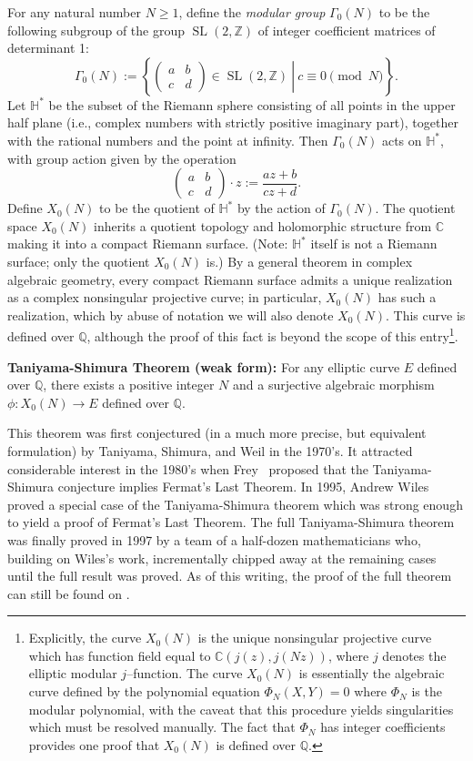 \documentclass[12pt]{article}
\newcommand{\SL}{\operatorname{SL}}
\newcommand{\Z}{{\mathbb{Z}}}
\renewcommand{\H}{{\mathbb{H}}}
\newcommand{\C}{{\mathbb{C}}}
\newcommand{\Q}{{\mathbb{Q}}}
\begin{document}
For any natural number $N \geq 1$, define the {\em modular group}
$\Gamma_0(N)$ to be the following subgroup of the group $\SL(2,\Z)$ of
integer coefficient matrices of determinant 1:
$$
\Gamma_0(N) := \left\{ \left. \begin{pmatrix} a & b \\ c & d
\end{pmatrix} \in \SL(2,\Z)\ \right|\ c \equiv 0 \pmod{N} \right\}.
$$
Let $\H^*$ be the subset of the Riemann sphere consisting of all
points in the upper half plane (i.e., complex numbers with strictly
positive imaginary part), together with the rational numbers and the
point at infinity. Then $\Gamma_0(N)$ acts on $\H^*$, with group
action given by the operation
$$
\begin{pmatrix} a & b \\ c & d \end{pmatrix} \cdot z := \frac{az+b}{cz+d}.
$$
Define $X_0(N)$ to be the quotient of $\H^*$ by the action of
$\Gamma_0(N)$. The quotient space $X_0(N)$ inherits a quotient
topology and holomorphic structure from $\C$ making it into a compact
Riemann surface. (Note: $\H^*$ itself is not a Riemann surface; only
the quotient $X_0(N)$ is.) By a general theorem in complex algebraic
geometry, every compact Riemann surface admits a unique realization as
a complex nonsingular projective curve; in particular, $X_0(N)$ has
such a realization, which by abuse of notation we will also denote
$X_0(N)$. This curve is defined over $\Q$, although the proof of this
fact is beyond the scope of this entry\footnote{Explicitly, the curve
$X_0(N)$ is the unique nonsingular projective curve which has function
field equal to $\C(j(z), j(Nz))$, where $j$ denotes the elliptic
modular $j$--function. The curve $X_0(N)$ is essentially the algebraic
curve defined by the polynomial equation $\Phi_N(X,Y) = 0$ where
$\Phi_N$ is the modular polynomial, with the caveat that this
procedure yields singularities which must be resolved manually. The
fact that $\Phi_N$ has integer coefficients provides one proof that
$X_0(N)$ is defined over $\Q$.}.

{\bf Taniyama-Shimura Theorem (weak form):} For any elliptic curve $E$ defined
over $\mathbb{Q}$, there exists a positive integer $N$ and a
surjective algebraic morphism $\phi: X_0(N) \to E$ defined over
$\mathbb{Q}$.

This theorem was first conjectured (in a much more precise, but equivalent formulation) by Taniyama, Shimura, and Weil in
the 1970's. It attracted considerable interest in the 1980's when
Frey~\cite{frey} proposed that the Taniyama-Shimura conjecture implies
Fermat's Last Theorem. In 1995, Andrew Wiles~\cite{wiles} proved a
special case of the Taniyama-Shimura theorem which was strong enough
to yield a proof of Fermat's Last Theorem. The full Taniyama-Shimura
theorem was finally proved in 1997 by a team of a half-dozen
mathematicians who, building on Wiles's work, incrementally chipped
away at the remaining cases until the full result was proved. As of this writing, the proof of the full theorem can still be found on .
\end{document}
